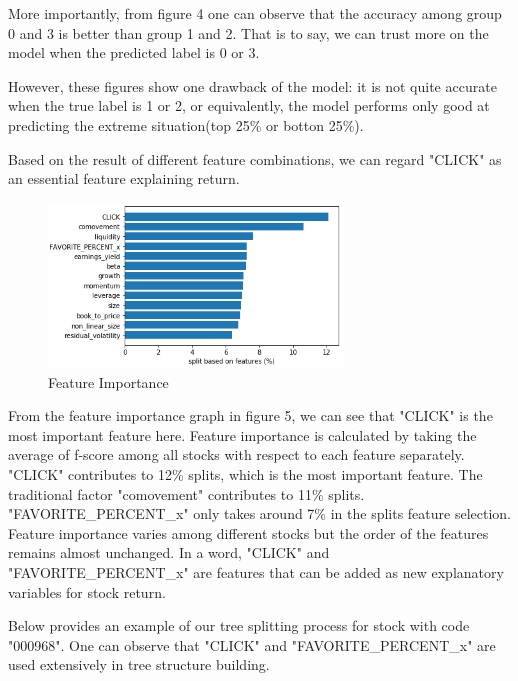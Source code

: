 \documentclass[letterpaper]{article}
\begin{document}
More importantly, from figure 4 one can observe that the accuracy among group 0 and 3 is better than group 1 and 2. That is to say, we can trust more on the model when the predicted label is 0 or 3.

However, these figures show one drawback of the model: it is not quite accurate when the true label is 1 or 2, or equivalently, the model performs only good at predicting the extreme situation(top 25\% or botton 25\%).



Based on the result of different feature combinations, we can regard "CLICK" as an essential feature explaining return.

\begin{figure}[htbp]
  \centering
  \includegraphics[width=0.7\textwidth]{barplot.png}
  \caption{Feature Importance}
\end{figure}

From the feature importance graph in figure 5, we can see that "CLICK" is the most important feature here. Feature importance is calculated by taking the average of f-score among all stocks with respect to each feature separately. "CLICK" contributes to 12\% splits, which is the most important feature. The traditional factor "comovement" contributes to 11\% splits. "FAVORITE\_PERCENT\_x" only takes around 7\% in the splits feature selection. Feature importance varies among different stocks but the order of the features remains almost unchanged. In a word, "CLICK" and "FAVORITE\_PERCENT\_x"  are features that can be added as new explanatory variables for stock return.

Below provides an example of our tree splitting process for stock with code "000968". One can observe that "CLICK" and "FAVORITE\_PERCENT\_x" are used extensively in tree structure building.
\end{document}
